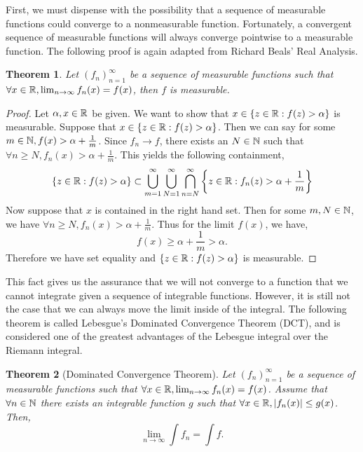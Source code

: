 \documentclass{article}
\newtheorem{theorem}{Theorem}
\theoremstyle{axiom} \newtheorem{axiom}{Axiom}
\theoremstyle{definition} \newtheorem{definition}{Definition}
\theoremstyle{example} \newtheorem{example}{Example}
\theoremstyle{proposition} \newtheorem{prop}{Proposition}
\theoremstyle{lemma} \newtheorem{lemma}{Lemma}
\begin{document}
First, we must dispense with the possibility that a sequence of
measurable functions could converge to a nonmeasurable function. Fortunately,
a convergent sequence of measurable functions will always converge pointwise to 
a measurable function. The following proof is again adapted from Richard Beals' 
Real Analysis.
\begin{theorem}
	Let $(f_n)^{\infty}_{n=1}$ be a sequence of measurable functions such that 
	$\forall x \in \mathbb{R}, \lim_{n\rightarrow \infty} f_n(x) = f(x)$, then $f$ is 
	measurable. 
\end{theorem}
\begin{proof}
	Let $\alpha, x \in \mathbb{R}$ be given. We want to show that  
	$x \in \{z \in \mathbb{R} : f(z) > \alpha\}$ is measurable. Suppose that $x \in \{z
	\in \mathbb{R} : f(z) > \alpha\}$. Then we can say for some $m \in \mathbb{N}, f(x) > \alpha+\frac{1}{m}$. Since 
	$f_n \rightarrow f$, there exists an $N \in \mathbb{N}$ such that 
	$\forall n \geq N, f_n(x) > \alpha+\frac{1}{m}$. This yields the following
	containment,
	\begin{equation*}
		\{z \in \mathbb{R} : f(z)  > \alpha \} \subset \bigcup^{\infty}_{m=1} \bigcup^{\infty}_{N=1} \bigcap^{\infty}_{n=N}
		\bigg\{z\in\mathbb{R} : f_n(z) > \alpha + \frac{1}{m}\bigg\}
	\end{equation*}
	Now suppose that $x$ is contained in the right hand set. Then for some 
	$m,N \in \mathbb{N}$, we have $\forall n \geq N, f_n (x) > \alpha + \frac{1}{m}$.
	Thus for the limit $f(x)$, we have,
	\begin{equation*}
		f(x) \geq \alpha + \frac{1}{m} > \alpha.
	\end{equation*}
	Therefore we have set equality and  $\{z \in \mathbb{R} : f(z) > \alpha\}$ is
	measurable. 
\end{proof}

This fact gives us the assurance that we will not converge to a function that
we cannot integrate given a sequence of integrable functions. However, it is
still not the case that we can always move the limit inside of the integral.
The following theorem is called Lebesgue's Dominated Convergence Theorem (DCT),
and is considered one of the greatest advantages of the Lebesgue integral over
the Riemann integral. 
\begin{theorem}[Dominated Convergence Theorem]
	Let $(f_n)^{\infty}_{n=1}$ be a sequence of measurable functions such that
	$\forall x \in \mathbb{R}, \lim_{n\rightarrow \infty}f_n(x) = f(x)$. Assume that
	$\forall n \in \mathbb{N}$ there exists an integrable function $g$ such that
	$\forall x \in \mathbb{R}, |f_n(x)| \leq g(x)$. Then,
	\begin{equation}
		\lim_{n\rightarrow \infty} \int f_n = \int f.
	\end{equation}
\end{theorem}
\end{document}
